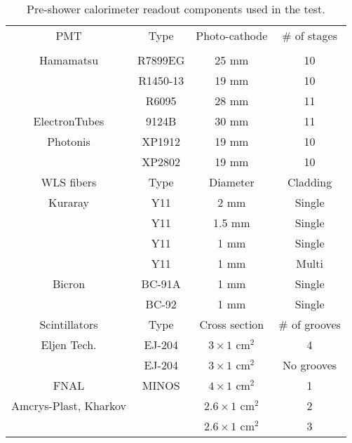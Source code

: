 \begin{table}[hbt!]
\begin{center}
\begin{tabular}{|c||c|c|c|} \hline 
PMT           & Type    & Photo-cathode & \# of stages \\
              &         &               &              \\ \hline
Hamamatsu     & R7899EG & 25 mm         & 10 \\
              & R1450-13& 19 mm         & 10 \\
              & R6095   & 28 mm         & 11 \\ \hline 
ElectronTubes & 9124B   & 30 mm         & 11 \\ \hline 
Photonis      & XP1912  & 19 mm         & 10 \\
              & XP2802  & 19 mm         & 10 \\ \hline \hline 
WLS fibers    & Type    & Diameter      & Cladding \\ \hline 
Kuraray       & Y11     & 2 mm          & Single   \\
              & Y11     & 1.5 mm        & Single   \\
              & Y11     & 1 mm          & Single   \\
              & Y11     & 1 mm          & Multi    \\ \hline 
Bicron        & BC-91A  & 1 mm          & Single   \\ 
              & BC-92   & 1 mm          & Single   \\ \hline \hline 
Scintillators & Type    & Cross section &\# of grooves \\ \hline 
Eljen Tech.   & EJ-204  & $3\times 1$ cm$^2$ & 4  \\
              & EJ-204  & $3\times 1$ cm$^2$ & No grooves \\ \hline 
FNAL          & MINOS   & $4\times 1$ cm$^2$ & 1  \\ \hline 
Amcrys-Plast, Kharkov   &               & $2.6\times 1$ cm$^2$ & 2 \\
                        &               & $2.6\times 1$ cm$^2$ & 3 \\ \hline  
\end{tabular}
\end{center} 
\caption{\small{Pre-shower calorimeter readout components used in the test.}} 
\label{tab:req} 
\end{table} 

